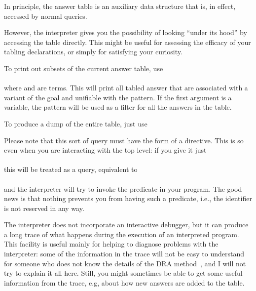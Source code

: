 
In principle, the answer table is an auxiliary data structure that is, in
effect, accessed by normal queries.

However, the interpreter gives you the possibility of looking ``under its
hood'' by accessing the table directly.  This might be useful for assessing
the efficacy of your tabling declarations, or simply for satisfying your
curiosity.

To print out subsets of the current answer table, use\\
\ind{}%
\label{dir:answers}\\
where  and  are terms.
This will print all tabled answer that are associated with a variant of the
goal and unifiable with the pattern.  If the first argument is a variable,
the pattern will be used as a filter for all the answers in the table.

To produce a dump of the entire table, just use\\
\ind{}

Please note that this sort of query must have the form of a directive.  This
is so even when you are interacting with the top level:  if you give it
just\\
\ind{}\\
this will be treated as a query, equivalent to\\
\ind{}\\
and the interpreter will try to invoke the predicate  in your
program.  The good news is that nothing prevents you from having such a
predicate, i.e., the identifier  is not reserved in any way.




The interpreter does not incorporate an interactive debugger, but it can
produce a long trace of what happens during the execution of an interpreted
program.  This facility is useful mainly for helping to diagnose problems
with the interpreter: some of the information in the trace will not be easy
to understand for someone who does not know the details of the DRA
method~\cite{guo-gupta-dra}, and I will not try to explain it all here.
Still, you might sometimes be able to get some useful information from the
trace, e.g, about how new answers are added to the table.

